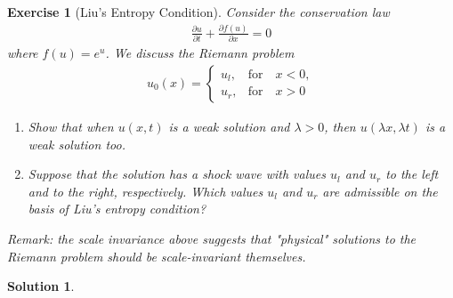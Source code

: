 \documentclass[10pt,letterpaper]{article}
\theoremstyle{break}
\newtheorem{exercise}{Exercise}
\newtheorem{mysolution}{Solution}
\newenvironment{solution}{\begin{mysolution}}{\end{mysolution}}
\begin{document}
\begin{exercise}[Liu's Entropy Condition]
    Consider the conservation law 
    \begin{align}
    	\frac{\partial u}{\partial t}
    	+
    	\frac{\partial f(u)}{\partial x}
    	= 0 
    \end{align}
    where $f(u) = e^u$. We discuss the Riemann problem
    \begin{align}
    	u_0(x) = 
    	\left\{
    	\begin{array}{cl}
    	u_l, & \text{for} \quad x<0,\\
    	u_r, &\text{for} \quad x > 0
    	\end{array}
    	\right.
    \end{align}
    \begin{enumerate}
        \item Show that when $u(x,t)$ is a weak solution and $\lambda > 0$, then $u(\lambda x, \lambda t)$ is a weak solution too.
        \item Suppose that the solution has a shock wave with values $u_l$ and $u_r$ to the left and to the right, respectively.
        Which values $u_l$ and $u_r$ are admissible on the basis of Liu's entropy condition?
    \end{enumerate}
    \textit{Remark: the scale invariance above suggests that "physical" solutions to the Riemann problem should be scale-invariant themselves.}
\end{exercise}

\begin{solution}
    
\end{solution}
\end{document}
